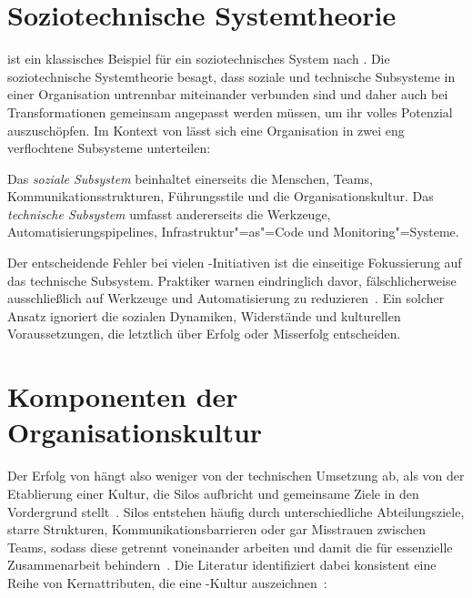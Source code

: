 \section{Soziotechnische Systemtheorie}

\DO ist ein klassisches Beispiel für ein soziotechnisches System nach \textcite[135-150]{rop09}.
Die soziotechnische Systemtheorie besagt, dass soziale und technische Subsysteme in einer Organisation untrennbar miteinander verbunden sind und daher auch bei Transformationen gemeinsam angepasst werden müssen, um ihr volles Potenzial auszuschöpfen.
Im Kontext von \DO lässt sich eine Organisation in zwei eng verflochtene Subsysteme unterteilen:

Das \emph{soziale Subsystem} beinhaltet einerseits die Menschen, Teams, Kommunikationsstrukturen, Führungsstile und die Organisationskultur.
Das \emph{technische Subsystem} umfasst andererseits die Werkzeuge, Automatisierungspipelines, Infrastruktur"=as"=Code und Monitoring"=Systeme.

Der entscheidende Fehler bei vielen \DO-Initiativen ist die einseitige Fokussierung auf das technische Subsystem.
Praktiker warnen eindringlich davor, \DO fälschlicherweise ausschließlich auf Werkzeuge und Automatisierung zu reduzieren~\cite[8]{aza23}.
Ein solcher Ansatz ignoriert die sozialen Dynamiken, Widerstände und kulturellen Voraussetzungen, die letztlich über Erfolg oder Misserfolg entscheiden.

\section{Komponenten der Organisationskultur}
Der Erfolg von \DO hängt also weniger von der technischen Umsetzung ab, als von der Etablierung einer Kultur, die Silos aufbricht und gemeinsame Ziele in den Vordergrund stellt~\cites[7\psq]{aza23}[313]{nay24}.
Silos entstehen häufig durch unterschiedliche Abteilungsziele, starre Strukturen, Kommunikationsbarrieren oder gar Misstrauen zwischen Teams, sodass diese getrennt voneinander arbeiten und damit die für \DO essenzielle Zusammenarbeit behindern~\cite[5]{mak25}.
Die Literatur identifiziert dabei konsistent eine Reihe von Kernattributen, die eine \DO-Kultur auszeichnen~\cites[4]{kre22}[281]{mas18}:

